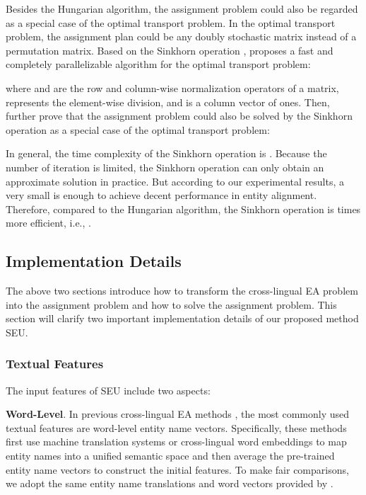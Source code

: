 \documentclass[11pt]{article}
\begin{document}
Besides the Hungarian algorithm, the assignment problem could also be regarded as a special case of the optimal transport problem.
In the optimal transport problem, the assignment plan  could be any doubly stochastic matrix instead of a permutation matrix.
Based on the Sinkhorn operation \cite{sinkhorn1964relationship,DBLP:journals/corr/abs-1106-1925}, \citet{DBLP:conf/nips/Cuturi13} proposes a fast and completely parallelizable algorithm for the optimal transport problem:

where  and  are the row and column-wise normalization operators of a matrix,  represents the element-wise division, and  is a column vector of ones.
Then, \citet{DBLP:conf/iclr/MenaBLS18} further prove that the assignment problem could also be solved by the Sinkhorn operation as a special case of the optimal transport problem:


In general, the time complexity of the Sinkhorn operation is .
Because the number of iteration  is limited, the Sinkhorn operation can only obtain an approximate solution in practice.
But according to our experimental results, a very small  is enough to achieve decent performance in entity alignment.
Therefore, compared to the Hungarian algorithm, the Sinkhorn operation is  times more efficient, i.e., .

\subsection{Implementation Details}
The above two sections introduce how to transform the cross-lingual EA problem into the assignment problem and how to solve the assignment problem.
This section will clarify two important implementation details of our proposed method SEU.

\subsubsection{Textual Features }
\label{TF}
The input features of SEU include two aspects:

\textbf{Word-Level}.
In previous cross-lingual EA methods \cite{DBLP:conf/acl/XuWYFSWY19,DBLP:conf/ijcai/WuLF0Y019}, the most commonly used textual features are word-level entity name vectors.
Specifically, these methods first use machine translation systems or cross-lingual word embeddings to map entity names into a unified semantic space and then average the pre-trained entity name vectors to construct the initial features.
To make fair comparisons, we adopt the same entity name translations and word vectors provided by \citet{DBLP:conf/acl/XuWYFSWY19}.
\end{document}
